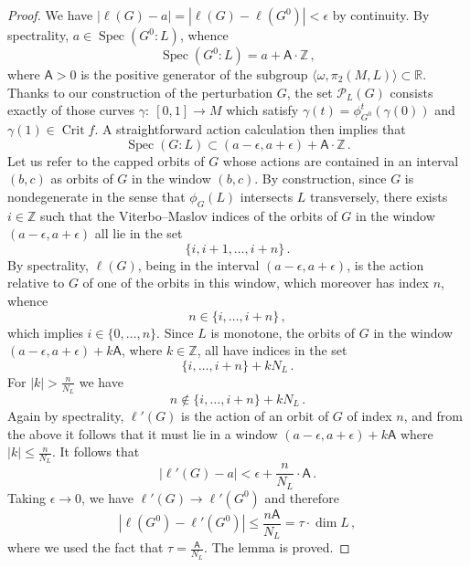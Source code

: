 \documentclass[11pt%
]{article}
\theoremstyle{definition}
\newcommand{\R}{{\mathbb{R}}}
\newcommand{\Z}{{\mathbb{Z}}}
\newcommand{\cP}{{\mathcal{P}}}
\newcommand{\fc}{{:\ }}
\DeclareMathOperator{\Crit}{Crit}
\DeclareMathOperator{\Spec}{Spec}
\DeclareMathOperator{\0}{\operatorname{\mathbf{0}}}
\begin{document}
\begin{proof}
  We have $|\ell(G) - a| = |\ell(G) - \ell(G^0)| < \epsilon$ by continuity. By spectrality, $a \in \Spec(G^0:L)$, whence
  $$\Spec(G^0:L) = a + \mathsf A\cdot \Z\,,$$
  where $\mathsf A >0$ is the positive generator of the subgroup $\langle \omega,\pi_2(M,L)\rangle \subset \R$. Thanks to our construction of the perturbation $G$, the set $\cP_L(G)$ consists exactly of those curves $\gamma \fc [0,1] \to M$ which satisfy $\gamma(t) = \phi_{G^0}^t(\gamma(0))$ and $\gamma(1) \in \Crit f$. A straightforward action calculation then implies that
  $$\Spec(G:L) \subset (a-\epsilon,a+\epsilon) + \mathsf A \cdot \Z\,.$$
  Let us refer to the capped orbits of $G$ whose actions are contained in an interval $(b,c)$ as orbits of $G$ in the window $(b,c)$. By construction, since $G$ is nondegenerate in the sense that $\phi_G(L)$ intersects $L$ transversely, there exists $i \in \Z$ such that the Viterbo--Maslov indices of the orbits of $G$ in the window $(a-\epsilon,a+\epsilon)$ all lie in the set
  $$\{i,i+1,\dots,i+n\}\,.$$
  By spectrality, $\ell(G)$, being in the interval $(a-\epsilon,a+\epsilon)$, is the action relative to $G$ of one of the orbits in this window, which moreover has index $n$, whence
  $$n \in \{i,\dots,i+n\}\,,$$
  which implies $i \in \{0,\dots,n\}$. Since $L$ is monotone, the orbits of $G$ in the window $(a-\epsilon,a+\epsilon)+k\mathsf A$, where $k \in \Z$, all have indices in the set
  $$\{i,\dots,i+n\} + kN_L\,.$$
  For $|k|>\frac{n}{N_L}$ we have
  $$n \notin \{i,\dots,i+n\} + kN_L\,.$$
  Again by spectrality, $\ell'(G)$ is the action of an orbit of $G$ of index $n$, and from the above it follows that it must lie in a window $(a-\epsilon,a+\epsilon)+k\mathsf A$ where $|k|\leq \frac{n}{N_L}$. It follows that
  $$|\ell'(G) - a| < \epsilon + \frac{n}{N_L}\cdot\mathsf A\,.$$
  Taking $\epsilon \to 0$, we have $\ell'(G) \to \ell'(G^0)$ and therefore
  $$|\ell(G^0) - \ell'(G^0)| \leq \frac{n\mathsf A}{N_L}=\tau\cdot\dim L\,,$$
  where we used the fact that $\tau=\frac{\mathsf A}{N_L}$. The lemma is proved.
\end{proof}
\end{document}
